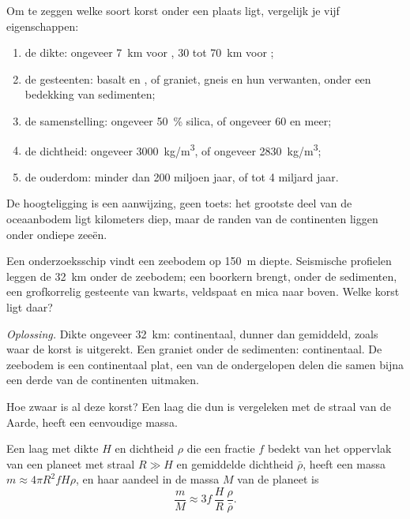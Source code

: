 \begin{method}\label{met:g12:continental-crust:compare}
Om te zeggen welke soort korst onder een plaats ligt, vergelijk je vijf eigenschappen:
\begin{enumerate}
  \item de dikte: ongeveer \qty{7}{km} voor , 30 tot
        \qty{70}{km} voor ;
  \item de gesteenten: basalt en , of graniet, gneis en hun
        verwanten, onder een bedekking van sedimenten;
  \item de samenstelling: ongeveer \qty{50}{\percent} silica, of ongeveer 60 en
        meer;
  \item de dichtheid: ongeveer \qty{3000}{kg/m^3}, of ongeveer \qty{2830}{kg/m^3};
  \item de ouderdom: minder dan 200 miljoen jaar, of tot 4 miljard jaar.
\end{enumerate}
De hoogteligging is een aanwijzing, geen toets: het grootste deel van de oceaanbodem ligt
kilometers diep, maar de randen van de continenten liggen onder ondiepe zeeën.
\end{method}

\begin{example}\label{ex:g12:continental-crust:shelf}
Een onderzoeksschip vindt een zeebodem op \qty{150}{m} diepte. Seismische profielen leggen de
 \qty{32}{km} onder de zeebodem; een boorkern brengt, onder de
sedimenten, een grofkorrelig gesteente van kwarts, veldspaat en mica naar boven. Welke korst
ligt daar?

\emph{Oplossing.} Dikte ongeveer \qty{32}{km}: continentaal, dunner dan
gemiddeld, zoals waar de korst is uitgerekt. Een graniet onder de sedimenten:
continentaal. De zeebodem is een continentaal plat, een van de ondergelopen
delen die samen bijna een derde van de continenten uitmaken.
\end{example}

Hoe zwaar is al deze korst? Een laag die dun is vergeleken met de straal van de
Aarde, heeft een eenvoudige massa.

\begin{proposition}\label{prop:g12:continental-crust:thin-layer}
Een laag met dikte $H$ en dichtheid $\rho$ die een fractie $f$ bedekt van het
oppervlak van een planeet met straal $R \gg H$ en gemiddelde dichtheid $\bar\rho$, heeft een
massa $m \approx 4\pi R^2 f H \rho$, en haar aandeel in de massa $M$ van de planeet is
\[
  \frac{m}{M} \approx 3 f\,\frac{H}{R}\,\frac{\rho}{\bar\rho}.
\]
\end{proposition}

